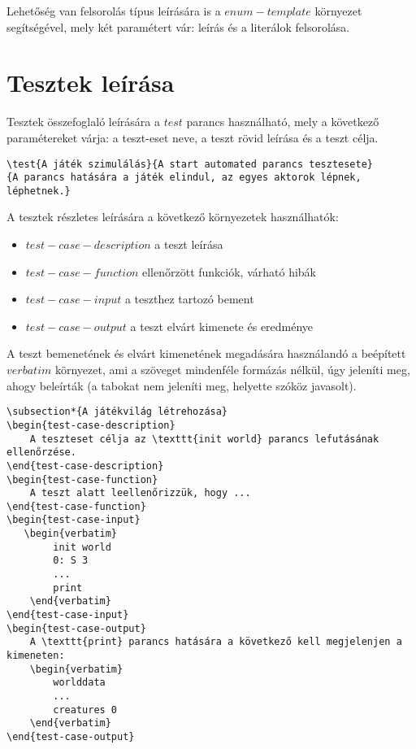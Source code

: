 \documentclass[]{article}
\begin{document}
Lehetőség van felsorolás típus leírására is a $enum-template$ környezet segítségével, mely két paramétert vár: leírás és a literálok felsorolása.

\section{Tesztek leírása}
Tesztek összefoglaló leírására a $test$ parancs használható, mely a következő paramétereket várja: a teszt-eset neve, a teszt rövid leírása és a teszt célja.
\begin{lstlisting}
\test{A játék szimulálás}{A start automated parancs tesztesete}
{A parancs hatására a játék elindul, az egyes aktorok lépnek, léphetnek.}
\end{lstlisting}
\vspace{15px}

A tesztek részletes leírására a következő környezetek használhatók: 
\begin{itemize}
    \item $test-case-description$ a teszt leírása
    \item $test-case-function$ ellenőrzött funkciók, várható hibák
    \item $test-case-input$ a teszthez tartozó bement
    \item $test-case-output$ a teszt elvárt kimenete és eredménye
\end{itemize}
A teszt bemenetének és elvárt kimenetének megadására használandó a beépített $verbatim$ környezet, ami a szöveget mindenféle formázás nélkül, úgy jeleníti meg, ahogy beleírták (a tabokat nem jeleníti meg, helyette szóköz javasolt).

\begin{lstlisting}
\subsection*{A játékvilág létrehozása}
\begin{test-case-description}
    A teszteset célja az \texttt{init world} parancs lefutásának ellenőrzése.
\end{test-case-description}
\begin{test-case-function}
    A teszt alatt leellenőrizzük, hogy ...
\end{test-case-function}
\begin{test-case-input}
   \begin{verbatim}
        init world
        0: S 3
        ...
        print
    \end{verbatim}
\end{test-case-input}
\begin{test-case-output}
    A \texttt{print} parancs hatására a következő kell megjelenjen a kimeneten:
    \begin{verbatim}
        worlddata
        ...
        creatures 0
    \end{verbatim}
\end{test-case-output}
\end{lstlisting}
\end{document}
